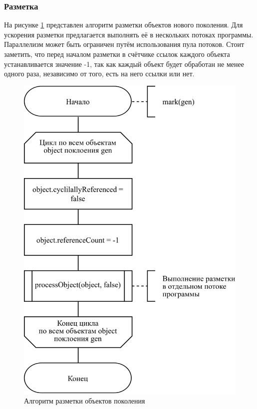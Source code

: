 \subsubsection*{Разметка}

На рисунке \ref{fig:mark-1} представлен алгоритм разметки объектов нового поколения. Для ускорения разметки предлагается выполнять её в нескольких потоках программы. Параллелизм может быть ограничен путём использования пула потоков. Стоит заметить, что перед началом разметки в счётчике ссылок каждого объекта устанавливается значение -1, так как каждый объект будет обработан не менее одного раза, независимо от того, есть на него ссылки или нет.

\begin{figure}[H]
	\centering
	\includegraphics[scale=0.185]{assets/mark-1.png}
	\caption{Алгоритм разметки объектов поколения}
	\label{fig:mark-1}
\end{figure}

